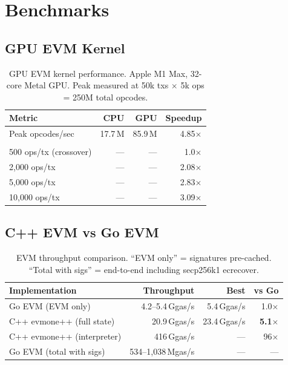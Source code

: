 \section{Benchmarks}

\label{sec:benchmarks}

\subsection{GPU EVM Kernel}

\begin{table}[h]
\centering
\small
\begin{tabular}{lrrr}
\toprule
\textbf{Metric} & \textbf{CPU} & \textbf{GPU} & \textbf{Speedup} \\
\midrule
Peak opcodes/sec           & 17.7\,M   & 85.9\,M   & 4.85$\times$ \\
\addlinespace
\multicolumn{4}{l}{\textit{By transaction complexity (50k txs):}} \\
500 ops/tx (crossover)     & ---        & ---        & 1.0$\times$ \\
2{,}000 ops/tx             & ---        & ---        & 2.08$\times$ \\
5{,}000 ops/tx             & ---        & ---        & 2.83$\times$ \\
10{,}000 ops/tx            & ---        & ---        & 3.09$\times$ \\
\bottomrule
\end{tabular}
\caption{GPU EVM kernel performance. Apple M1 Max, 32-core Metal GPU.
Peak measured at 50k txs $\times$ 5k ops = 250M total opcodes.}
\label{tab:gpu_evm}
\end{table}

\subsection{C++ EVM vs Go EVM}

\begin{table}[h]
\centering
\small
\begin{tabular}{lrrr}
\toprule
\textbf{Implementation} & \textbf{Throughput} & \textbf{Best} & \textbf{vs Go} \\
\midrule
Go EVM (EVM only)            & 4.2--5.4\,Ggas/s & 5.4\,Ggas/s  & 1.0$\times$ \\
C++ evmone++ (full state)    & 20.9\,Ggas/s     & 23.4\,Ggas/s & \textbf{5.1$\times$} \\
C++ evmone++ (interpreter)   & 416\,Ggas/s      & ---           & 96$\times$ \\
\midrule
Go EVM (total with sigs)     & 534--1{,}038\,Mgas/s & ---       & --- \\
\bottomrule
\end{tabular}
\caption{EVM throughput comparison. ``EVM only'' = signatures pre-cached.
``Total with sigs'' = end-to-end including secp256k1 ecrecover.}
\label{tab:cpp_go}
\end{table}

